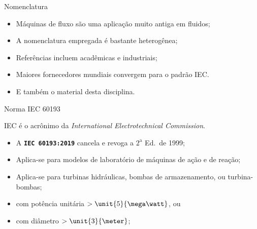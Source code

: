    \begin{frame}{Nomenclatura}\vspace*{-2em}

        \begin{itemize}
            \item<1-> Máquinas de fluxo são uma \alert{aplicação muito antiga} em fluidos;
            \item<1-> A \alert{nomenclatura} empregada é \alert{bastante heterogênea};
            \item<2-> Referências incluem \alert{acadêmicas} e \alert{industriais};
            \item<2-> \alert{Maiores fornecedores mundiais} convergem para o \alert{padrão IEC}.
            \item<3-> E também o material desta disciplina.
        \end{itemize}

    \end{frame}

    \begin{frame}{Norma IEC 60193}\vspace*{-2em}

        IEC é o acrônimo da \textit{International Electrotechnical Commission\/}.
        \vspace*{\medskipamount}

        \begin{itemize}
            \item<1-> A \alert{\textbf{\texttt{IEC 60193:2019}}} cancela e revoga a
                $2^{\mathrm{a}}$ Ed.~de 1999;
            \item<1-> Aplica-se para \alert{modelos de laboratório} de máquinas de \alert{ação}
                e de \alert{reação};
            \item<1-> Aplica-se para \alert{turbinas hidráulicas}, \alert{bombas de
                armazenamento}, ou \alert{turbina-bombas};
            \item<2-> com \alert{potência unitária $> \unit{5}{\mega\watt}$}, ou
            \item<2-> com \alert{diâmetro $> \unit{3}{\meter}$};
        \end{itemize}

    \end{frame}

